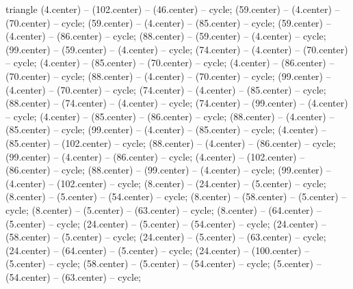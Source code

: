 \begin{pgfonlayer}{triangle}
 (4.center) -- (102.center) -- (46.center) -- cycle; 
 (59.center) -- (4.center) -- (70.center) -- cycle; 
 (59.center) -- (4.center) -- (85.center) -- cycle; 
 (59.center) -- (4.center) -- (86.center) -- cycle; 
 (88.center) -- (59.center) -- (4.center) -- cycle; 
 (99.center) -- (59.center) -- (4.center) -- cycle; 
 (74.center) -- (4.center) -- (70.center) -- cycle; 
 (4.center) -- (85.center) -- (70.center) -- cycle; 
 (4.center) -- (86.center) -- (70.center) -- cycle; 
 (88.center) -- (4.center) -- (70.center) -- cycle; 
 (99.center) -- (4.center) -- (70.center) -- cycle; 
 (74.center) -- (4.center) -- (85.center) -- cycle; 
 (88.center) -- (74.center) -- (4.center) -- cycle; 
 (74.center) -- (99.center) -- (4.center) -- cycle; 
 (4.center) -- (85.center) -- (86.center) -- cycle; 
 (88.center) -- (4.center) -- (85.center) -- cycle; 
 (99.center) -- (4.center) -- (85.center) -- cycle; 
 (4.center) -- (85.center) -- (102.center) -- cycle; 
 (88.center) -- (4.center) -- (86.center) -- cycle; 
 (99.center) -- (4.center) -- (86.center) -- cycle; 
 (4.center) -- (102.center) -- (86.center) -- cycle; 
 (88.center) -- (99.center) -- (4.center) -- cycle; 
 (99.center) -- (4.center) -- (102.center) -- cycle; 
 (8.center) -- (24.center) -- (5.center) -- cycle; 
 (8.center) -- (5.center) -- (54.center) -- cycle; 
 (8.center) -- (58.center) -- (5.center) -- cycle; 
 (8.center) -- (5.center) -- (63.center) -- cycle; 
 (8.center) -- (64.center) -- (5.center) -- cycle; 
 (24.center) -- (5.center) -- (54.center) -- cycle; 
 (24.center) -- (58.center) -- (5.center) -- cycle; 
 (24.center) -- (5.center) -- (63.center) -- cycle; 
 (24.center) -- (64.center) -- (5.center) -- cycle; 
 (24.center) -- (100.center) -- (5.center) -- cycle; 
 (58.center) -- (5.center) -- (54.center) -- cycle; 
 (5.center) -- (54.center) -- (63.center) -- cycle; 

\end{pgfonlayer}
